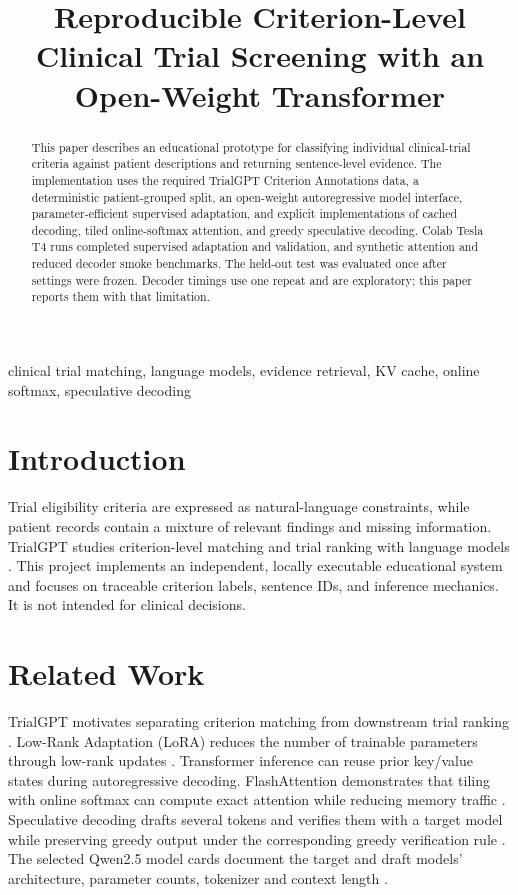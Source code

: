 \documentclass[conference]{IEEEtran}
\title{Reproducible Criterion-Level Clinical Trial Screening with an Open-Weight Transformer}
\author{\IEEEauthorblockN{Taimoor Ahmad}\IEEEauthorblockA{Department of Computer Science, FAST National University of Computer and Emerging Sciences\\\url{https://github.com/taimoorahmadx/genai-a2}}}
\begin{document}
\maketitle
\begin{abstract}
This paper describes an educational prototype for classifying individual clinical-trial criteria against patient descriptions and returning sentence-level evidence. The implementation uses the required TrialGPT Criterion Annotations data, a deterministic patient-grouped split, an open-weight autoregressive model interface, parameter-efficient supervised adaptation, and explicit implementations of cached decoding, tiled online-softmax attention, and greedy speculative decoding. Colab Tesla T4 runs completed supervised adaptation and validation, and synthetic attention and reduced decoder smoke benchmarks. The held-out test was evaluated once after settings were frozen. Decoder timings use one repeat and are exploratory; this paper reports them with that limitation.
\end{abstract}
\begin{IEEEkeywords}clinical trial matching, language models, evidence retrieval, KV cache, online softmax, speculative decoding\end{IEEEkeywords}

\section{Introduction}
Trial eligibility criteria are expressed as natural-language constraints, while patient records contain a mixture of relevant findings and missing information. TrialGPT studies criterion-level matching and trial ranking with language models \cite{trialgpt}. This project implements an independent, locally executable educational system and focuses on traceable criterion labels, sentence IDs, and inference mechanics. It is not intended for clinical decisions.

\section{Related Work}
TrialGPT motivates separating criterion matching from downstream trial ranking \cite{trialgpt}. Low-Rank Adaptation (LoRA) reduces the number of trainable parameters through low-rank updates \cite{lora}. Transformer inference can reuse prior key/value states during autoregressive decoding. FlashAttention demonstrates that tiling with online softmax can compute exact attention while reducing memory traffic \cite{flashattn}. Speculative decoding drafts several tokens and verifies them with a target model while preserving greedy output under the corresponding greedy verification rule \cite{specdecode}. The selected Qwen2.5 model cards document the target and draft models' architecture, parameter counts, tokenizer and context length \cite{qwen15,qwen05}.
\end{document}
